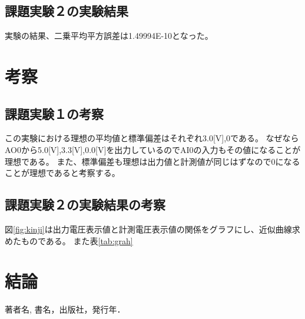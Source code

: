 \documentclass[11pt,dvipdfmx]{jarticle}
\begin{document}
	\subsection{課題実験２の実験結果}
		実験の結果、二乗平均平方誤差は1.49994E-10となった。
\section{考察}
	\subsection{課題実験１の考察}
	この実験における理想の平均値と標準偏差はそれぞれ3.0[V],0である。
	なぜならAO0から5.0[V],3.3[V],0.0[V]を出力しているのでAI0の入力もその値になることが理想である。
	また、標準偏差も理想は出力値と計測値が同じはずなので0になることが理想であると考察する。

	\subsection{課題実験２の実験結果の考察}
	図\ref{fig:kinji}は出力電圧表示値と計測電圧表示値の関係をグラフにし、近似曲線求めたものである。
	また表\ref{tab:grah}

\section{結論}

\begin{thebibliography}{9}%
	 著者名, 書名，出版社，発行年．
\end{thebibliography}
\end{document}

